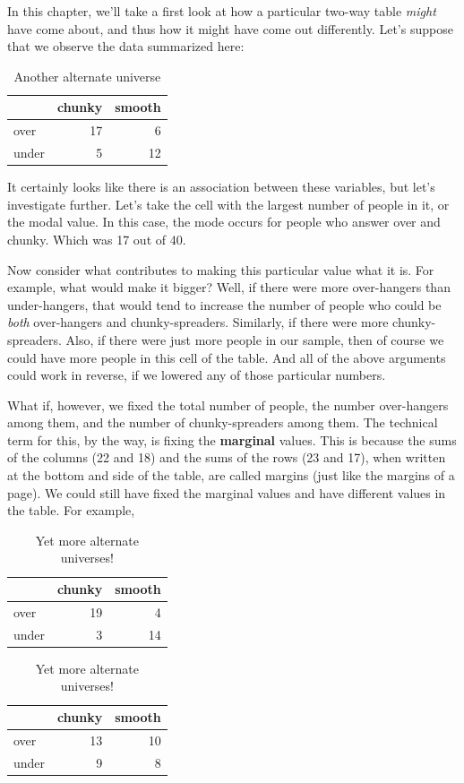 \documentclass[openany]{book}
\begin{document}
In this chapter, we'll take a first look at how a particular two-way table \emph{might} have come about, and thus how it might have come out differently. Let's suppose that we observe the data summarized here:

\begin{table}[!h]

\caption{\label{tab:indep-sim}Another alternate universe}
\centering
\begin{tabular}[t]{lrr}
\toprule
  & chunky & smooth\\
\midrule
over & 17 & 6\\
under & 5 & 12\\
\bottomrule
\end{tabular}
\end{table}

It certainly looks like there is an association between these variables, but let's investigate further. Let's take the cell with the largest number of people in it, or the modal value. In this case, the mode occurs for people who answer over and chunky. Which was 17 out of 40.

Now consider what contributes to making this particular value what it is. For example, what would make it bigger? Well, if there were more over-hangers than under-hangers, that would tend to increase the number of people who could be \emph{both} over-hangers and chunky-spreaders. Similarly, if there were more chunky-spreaders. Also, if there were just more people in our sample, then of course we could have more people in this cell of the table. And all of the above arguments could work in reverse, if we lowered any of those particular numbers.

What if, however, we fixed the total number of people, the number over-hangers among them, and the number of chunky-spreaders among them. The technical term for this, by the way, is fixing the \textbf{marginal} values. This is because the sums of the columns (22 and 18) and the sums of the rows (23 and 17), when written at the bottom and side of the table, are called margins (just like the margins of a page). We could still have fixed the marginal values and have different values in the table. For example,

\begin{table}[!h]
\caption{\label{tab:unnamed-chunk-8}Yet more alternate universes!}

\centering
\begin{tabular}[t]{lrr}
\toprule
  & chunky & smooth\\
\midrule
over & 19 & 4\\
under & 3 & 14\\
\bottomrule
\end{tabular}
\centering
\begin{tabular}[t]{lrr}
\toprule
  & chunky & smooth\\
\midrule
over & 13 & 10\\
under & 9 & 8\\
\bottomrule
\end{tabular}
\end{table}
\end{document}
